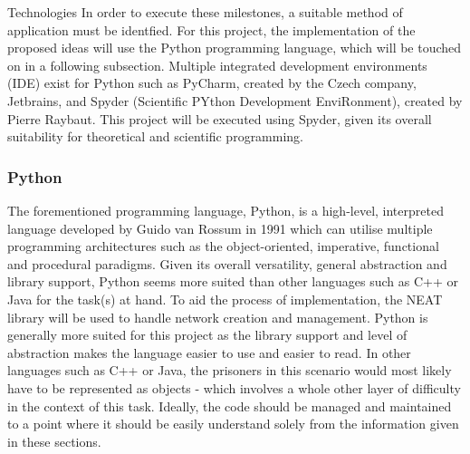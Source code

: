 \documentclass[12pt,a4paper]{article}
\makeatletter
\renewcommand\subsection{\@startsection {subsection}{1}{2mm}
                               {3pt plus 2pt minus 1pt}
                               {3pt plus 0pt}
                               {\normalfont\bfseries}}
\makeatother
\begin{document}
\subsection{Technologies}
In order to execute these milestones, a suitable method of application must be identfied. For this project, the implementation of the proposed ideas will use the Python programming language, which will be touched on in a following subsection. Multiple integrated development environments (IDE) exist for Python such as PyCharm, created by the Czech company, Jetbrains, and Spyder (Scientific PYthon Development EnviRonment), created by Pierre Raybaut. This project will be executed using Spyder, given its overall suitability for theoretical and scientific programming.

\subsubsection{Python}
The forementioned programming language, Python, is a high-level, interpreted language developed by Guido van Rossum in 1991 which can utilise multiple programming architectures such as the object-oriented, imperative, functional and procedural paradigms. Given its overall versatility, general abstraction and library support, Python seems more suited than other languages such as C++ or Java for the task(s) at hand. To aid the process of implementation, the NEAT library will be used to handle network creation and management. Python is generally more suited for this project as the library support and level of abstraction makes the language easier to use and easier to read. In other languages such as C++ or Java, the prisoners in this scenario would most likely have to be represented as objects - which involves a whole other layer of difficulty in the context of this task. Ideally, the code should be managed and maintained to a point where it should be easily understand solely from the information given in these sections.
\end{document}
